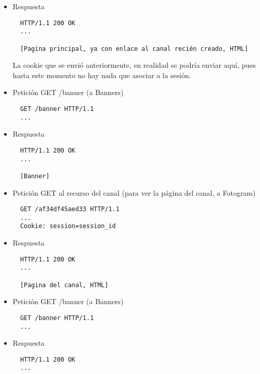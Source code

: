 {\begin{itemize}
\begin{verbatim}
  POST / HTTP/1.1
  ...
  Cookie: session=session_id

  canal=Nombre&recurso=Recurso
\end{verbatim}

\item Respuesta

\begin{verbatim}
  HTTP/1.1 200 OK
  ...

  [Pagina principal, ya con enlace al canal recién creado, HTML]
\end{verbatim}

La cookie que se envió anteriormente, en realidad se podría enviar aquí, pues hasta este momento no hay nada que asociar a la sesión.

\item Petición GET /banner (a Banners)

\begin{verbatim}
  GET /banner HTTP/1.1
  ...
\end{verbatim}

\item Respuesta

\begin{verbatim}
  HTTP/1.1 200 OK
  ...

  [Banner]
\end{verbatim}

\item Petición GET al recurso del canal (para ver la página del canal, a Fotogram)

\begin{verbatim}
  GET /af34df45aed33 HTTP/1.1
  ...
  Cookie: session=session_id
\end{verbatim}

\item Respuesta

\begin{verbatim}
  HTTP/1.1 200 OK
  ...

  [Pagina del canal, HTML]
\end{verbatim}

\item Petición GET /banner (a Banners)

\begin{verbatim}
  GET /banner HTTP/1.1
  ...
\end{verbatim}

\item Respuesta

\begin{verbatim}
  HTTP/1.1 200 OK
  ...


\end{verbatim}
\end{itemize}}
